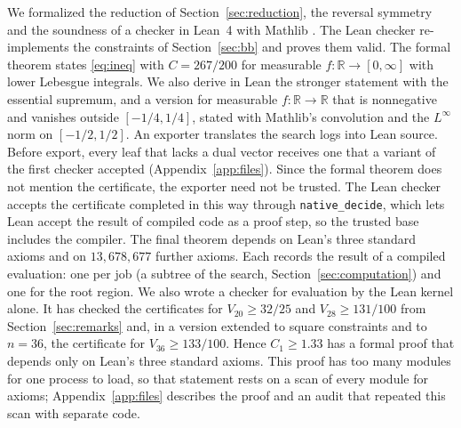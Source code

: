 \documentclass[11pt]{amsart}
\theoremstyle{definition}
\theoremstyle{remark}
\numberwithin{equation}{section}
\newcommand{\R}{\mathbb{R}}
\newcommand{\LeanNAxioms}{$13{,}678{,}677$}
\begin{document}
We formalized the reduction of Section~\ref{sec:reduction}, the reversal symmetry and the soundness of a checker in Lean~4 \cite{Lean4} with Mathlib \cite{Mathlib}. The Lean checker re-implements the constraints of Section~\ref{sec:bb} and proves them valid. The formal theorem states \eqref{eq:ineq} with $C=267/200$ for measurable $f\colon\R\to[0,\infty]$ with lower Lebesgue integrals. We also derive in Lean the stronger statement with the essential supremum, and a version for measurable $f\colon\R\to\R$ that is nonnegative and vanishes outside $[-1/4,1/4]$, stated with Mathlib's convolution and the $L^\infty$ norm on $[-1/2,1/2]$. An exporter translates the search logs into Lean source. Before export, every leaf that lacks a dual vector receives one that a variant of the first checker accepted (Appendix~\ref{app:files}). Since the formal theorem does not mention the certificate, the exporter need not be trusted. The Lean checker accepts the certificate completed in this way through \texttt{native\_decide}, which lets Lean accept the result of compiled code as a proof step, so the trusted base includes the compiler. The final theorem depends on Lean's three standard axioms and on \LeanNAxioms{} further axioms. Each records the result of a compiled evaluation: one per job (a subtree of the search, Section~\ref{sec:computation}) and one for the root region. We also wrote a checker for evaluation by the Lean kernel alone. It has checked the certificates for $V_{20}\ge 32/25$ and $V_{28}\ge131/100$ from Section~\ref{sec:remarks} and, in a version extended to square constraints and to $n=36$, the certificate for $V_{36}\ge133/100$. Hence $C_1\ge1.33$ has a formal proof that depends only on Lean's three standard axioms. This proof has too many modules for one process to load, so that statement rests on a scan of every module for axioms; Appendix~\ref{app:files} describes the proof and an audit that repeated this scan with separate code.
\end{document}
